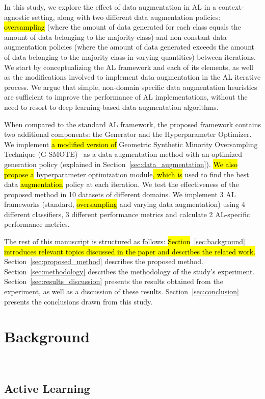 \documentclass[preprint, 12pt]{elsarticle}
\begin{document}
In this study, we explore the effect of data augmentation in AL in a
context-agnostic setting, along with two different data augmentation policies:
\hl{oversampling} (where the amount of data generated for each class equals
the amount of data belonging to the majority class) and non-constant data
augmentation policies (where the amount of data generated exceeds the amount
of data belonging to the majority class in varying quantities) between
iterations. We start by conceptualizing the AL framework and each of its
elements, as well as the modifications involved to implement data augmentation
in the AL iterative process. We argue that simple, non-domain specific data
augmentation heuristics are sufficient to improve the performance of AL
implementations, without the need to resort to deep learning-based data
augmentation algorithms.

When compared to the standard AL framework, the proposed framework contains
two additional components: the Generator and the Hyperparameter Optimizer. We
implement \hl{a modified version of }Geometric Synthetic Minority Oversampling
Technique (G-SMOTE)~\cite{Douzas2019} as a data augmentation method with an
optimized generation policy (explained in
Section~\ref{sec:data_augmentation}). \hl{We also propose a} hyperparameter
optimization module\hl{, which is} used to find the best data
\hl{augmentation} policy at each iteration. We test the effectiveness of the
proposed method in 10 datasets of different domains. We implement 3 AL
frameworks (standard, \hl{oversampling} and varying data augmentation) using 4
different classifiers, 3 different performance metrics and calculate 2
AL-specific performance metrics. 

The rest of this manuscript is structured as follows:
\hl{Section}~\ref{sec:background} \hl{introduces relevant topics discussed in
the paper and describes the related work.} Section~\ref{sec:proposed_method}
describes the proposed method. Section~\ref{sec:methodology} describes the
methodology of the study's experiment. Section~\ref{sec:results_discussion}
presents the results obtained from the experiment, as well as a discussion of
these results. Section~\ref{sec:conclusion} presents the conclusions drawn
from this study.
 
\section{Background}~\label{sec:background}

\subsection{Active Learning}~\label{sec:active_learning_methods}
\end{document}
